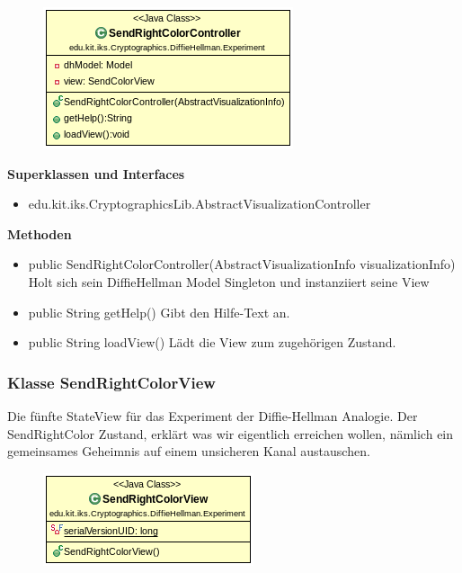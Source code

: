 \documentclass{article}
\begin{document}
      \begin{figure}[H]
        \centering
        \includegraphics{resources/edu-kit-iks-Cryptographics-DiffieHellman-Experiment-SendRightColorController}
      \end{figure}

      \textbf{Superklassen und Interfaces}
      \begin{itemize}
        \item edu.kit.iks.CryptographicsLib.AbstractVisualizationController
      \end{itemize}

      \textbf{Methoden}
      \begin{itemize}
          \item public SendRightColorController(AbstractVisualizationInfo visualizationInfo) \newline
              Holt sich sein DiffieHellman Model Singleton und instanziiert seine View
        \item public String getHelp() \newline
        Gibt den Hilfe-Text an.
        \item public String loadView() \newline
        Lädt die View zum zugehörigen Zustand.
      \end{itemize}

\subsubsection{Klasse SendRightColorView}
      Die fünfte StateView für das Experiment der Diffie-Hellman Analogie.
      Der SendRightColor Zustand, erklärt was wir eigentlich erreichen wollen,
      nämlich ein gemeinsames Geheimnis auf einem unsicheren Kanal austauschen.

      \begin{figure}[H]
        \centering
        \includegraphics{resources/edu-kit-iks-Cryptographics-DiffieHellman-Experiment-SendRightColorView}
      \end{figure}
\end{document}
